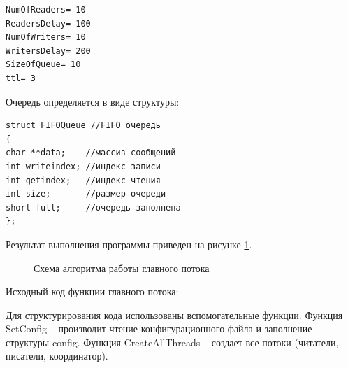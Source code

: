 \documentclass[a4paper]{article}
\begin{document}
	\begin{lstlisting}[style=crs_cpp]
NumOfReaders= 10 
ReadersDelay= 100 
NumOfWriters= 10 
WritersDelay= 200 
SizeOfQueue= 10 
ttl= 3
	\end{lstlisting}
Очередь определяется в виде структуры:
	\begin{lstlisting}[style=crs_cpp]
struct FIFOQueue //FIFO очередь 
{ 
char **data; 	//массив сообщений 
int writeindex; //индекс записи 
int getindex; 	//индекс чтения 
int size; 		//размер очереди 
short full; 	//очередь заполнена 
};
	\end{lstlisting}

	Результат выполнения программы приведен на рисунке \ref{img:alg_main_thread}.
	\begin{figure}[h!]
		\caption{Схема алгоритма работы главного потока}
		\label{img:alg_main_thread}
	\end{figure}

	Исходный код функции главного потока:
	
	Для структурирования кода использованы вспомогательные функции.
Функция SetConfig – производит чтение конфигурационного файла и заполнение структуры config. Функция CreateAllThreads – создает все потоки (читатели, писатели, координатор).\\
\end{document}
